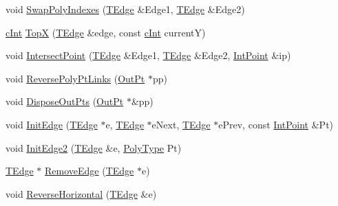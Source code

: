 \begin{DoxyCompactItemize}
\item 
void \mbox{\hyperlink{namespace_clipper_lib_a17c02161ee129cdb347b0a6a18a73849}{Swap\+Poly\+Indexes}} (\mbox{\hyperlink{struct_clipper_lib_1_1_t_edge}{T\+Edge}} \&Edge1, \mbox{\hyperlink{struct_clipper_lib_1_1_t_edge}{T\+Edge}} \&Edge2)
\item 
\mbox{\hyperlink{namespace_clipper_lib_a7156730a24951629192d4831334bafaa}{c\+Int}} \mbox{\hyperlink{namespace_clipper_lib_a63e0b77cf7232cbd4f9909b25bd300be}{TopX}} (\mbox{\hyperlink{struct_clipper_lib_1_1_t_edge}{T\+Edge}} \&edge, const \mbox{\hyperlink{namespace_clipper_lib_a7156730a24951629192d4831334bafaa}{c\+Int}} currentY)
\item 
void \mbox{\hyperlink{namespace_clipper_lib_acc907411a778b9ae34f8d852aaa7622a}{Intersect\+Point}} (\mbox{\hyperlink{struct_clipper_lib_1_1_t_edge}{T\+Edge}} \&Edge1, \mbox{\hyperlink{struct_clipper_lib_1_1_t_edge}{T\+Edge}} \&Edge2, \mbox{\hyperlink{struct_clipper_lib_1_1_int_point}{Int\+Point}} \&ip)
\item 
void \mbox{\hyperlink{namespace_clipper_lib_a5148d4f90b324e0e4a13d1b13055661f}{Reverse\+Poly\+Pt\+Links}} (\mbox{\hyperlink{struct_clipper_lib_1_1_out_pt}{Out\+Pt}} $\ast$pp)
\item 
void \mbox{\hyperlink{namespace_clipper_lib_aefcf521aa7d6c94a55e4426872170bdf}{Dispose\+Out\+Pts}} (\mbox{\hyperlink{struct_clipper_lib_1_1_out_pt}{Out\+Pt}} $\ast$\&pp)
\item 
void \mbox{\hyperlink{namespace_clipper_lib_a1b822f020efce65b1e0c4fcdb264fd35}{Init\+Edge}} (\mbox{\hyperlink{struct_clipper_lib_1_1_t_edge}{T\+Edge}} $\ast$e, \mbox{\hyperlink{struct_clipper_lib_1_1_t_edge}{T\+Edge}} $\ast$e\+Next, \mbox{\hyperlink{struct_clipper_lib_1_1_t_edge}{T\+Edge}} $\ast$e\+Prev, const \mbox{\hyperlink{struct_clipper_lib_1_1_int_point}{Int\+Point}} \&Pt)
\item 
void \mbox{\hyperlink{namespace_clipper_lib_ae5ad4a2545fa1528f81bd2a89d9cddcb}{Init\+Edge2}} (\mbox{\hyperlink{struct_clipper_lib_1_1_t_edge}{T\+Edge}} \&e, \mbox{\hyperlink{namespace_clipper_lib_a50d662440e5e100070014ed91281e960}{Poly\+Type}} Pt)
\item 
\mbox{\hyperlink{struct_clipper_lib_1_1_t_edge}{T\+Edge}} $\ast$ \mbox{\hyperlink{namespace_clipper_lib_ab1ca13d57b512273ce6821c26f9abda0}{Remove\+Edge}} (\mbox{\hyperlink{struct_clipper_lib_1_1_t_edge}{T\+Edge}} $\ast$e)
\item 
void \mbox{\hyperlink{namespace_clipper_lib_a308e107fa8e429684f57440687d77adc}{Reverse\+Horizontal}} (\mbox{\hyperlink{struct_clipper_lib_1_1_t_edge}{T\+Edge}} \&e)

\end{DoxyCompactItemize}

